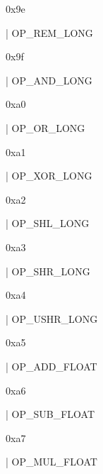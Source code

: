 \documentclass[11pt]{article}
\begin{document}
\begin{ocamldoccomment}
0x9e
\end{ocamldoccomment}
\begin{ocamldoccode}
  | OP_REM_LONG
\end{ocamldoccode}
\begin{ocamldoccomment}
0x9f
\end{ocamldoccomment}
\begin{ocamldoccode}
  | OP_AND_LONG
\end{ocamldoccode}
\begin{ocamldoccomment}
0xa0
\end{ocamldoccomment}
\begin{ocamldoccode}
  | OP_OR_LONG
\end{ocamldoccode}
\begin{ocamldoccomment}
0xa1
\end{ocamldoccomment}
\begin{ocamldoccode}
  | OP_XOR_LONG
\end{ocamldoccode}
\begin{ocamldoccomment}
0xa2
\end{ocamldoccomment}
\begin{ocamldoccode}
  | OP_SHL_LONG
\end{ocamldoccode}
\begin{ocamldoccomment}
0xa3
\end{ocamldoccomment}
\begin{ocamldoccode}
  | OP_SHR_LONG
\end{ocamldoccode}
\begin{ocamldoccomment}
0xa4
\end{ocamldoccomment}
\begin{ocamldoccode}
  | OP_USHR_LONG
\end{ocamldoccode}
\begin{ocamldoccomment}
0xa5
\end{ocamldoccomment}
\begin{ocamldoccode}
  | OP_ADD_FLOAT
\end{ocamldoccode}
\begin{ocamldoccomment}
0xa6
\end{ocamldoccomment}
\begin{ocamldoccode}
  | OP_SUB_FLOAT
\end{ocamldoccode}
\begin{ocamldoccomment}
0xa7
\end{ocamldoccomment}
\begin{ocamldoccode}
  | OP_MUL_FLOAT
\end{ocamldoccode}
\end{document}
